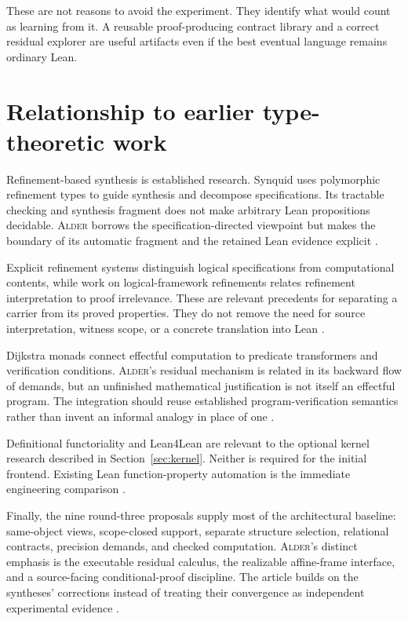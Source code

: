 \documentclass[11pt,a4paper]{article}
\newcommand{\Alder}{\textsc{Alder}}
\theoremstyle{plain}
\theoremstyle{definition}
\theoremstyle{remark}
\begin{document}
These are not reasons to avoid the experiment. They identify what would count as learning from it. A reusable proof-producing contract library and a correct residual explorer are useful artifacts even if the best eventual language remains ordinary Lean.

\section{Relationship to earlier type-theoretic work}\label{sec:related}
Refinement-based synthesis is established research. Synquid uses polymorphic refinement types to guide synthesis and decompose specifications. Its tractable checking and synthesis fragment does not make arbitrary Lean propositions decidable. \Alder{} borrows the specification-directed viewpoint but makes the boundary of its automatic fragment and the retained Lean evidence explicit \cite{synquid}.

Explicit refinement systems distinguish logical specifications from computational contents, while work on logical-framework refinements relates refinement interpretation to proof irrelevance. These are relevant precedents for separating a carrier from its proved properties. They do not remove the need for source interpretation, witness scope, or a concrete translation into Lean \cite{explicitref,lovas}.

Dijkstra monads connect effectful computation to predicate transformers and verification conditions. \Alder's residual mechanism is related in its backward flow of demands, but an unfinished mathematical justification is not itself an effectful program. The integration should reuse established program-verification semantics rather than invent an informal analogy in place of one \cite{dijkstra,mvcgen}.

Definitional functoriality and Lean4Lean are relevant to the optional kernel research described in Section~\ref{sec:kernel}. Neither is required for the initial frontend. Existing Lean function-property automation is the immediate engineering comparison \cite{functoriality,lean4lean,funprop}.

Finally, the nine round-three proposals supply most of the architectural baseline: same-object views, scope-closed support, separate structure selection, relational contracts, precision demands, and checked computation. \Alder's distinct emphasis is the executable residual calculus, the realizable affine-frame interface, and a source-facing conditional-proof discipline. The article builds on the syntheses' corrections instead of treating their convergence as independent experimental evidence \cite{r3a,r3b}.
\end{document}
